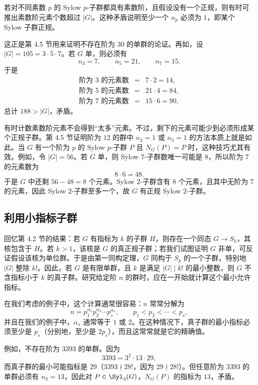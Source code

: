 若对不同素数 $p$ 的 Sylow $p$-子群都具有素数阶，且假设没有一个正规，则有时可推出素数阶元素个数超过 $|G|$。这种矛盾说明至少一个 $n_p$ 必须为 $1$，即某个 Sylow 子群正规。

这正是第 4.5 节用来证明不存在阶为 $30$ 的单群的论证。再如，设 $|G|=105=3\cdot5\cdot7$。若 $G$ 单，则必须有
\[
  n_3=7,
  \qquad n_5=21,
  \qquad n_7=15.
\]
于是
\[
\begin{array}{rcl}
\text{阶为 }3\text{ 的元素数} &=& 7\cdot2=14,\\
\text{阶为 }5\text{ 的元素数} &=& 21\cdot4=84,\\
\text{阶为 }7\text{ 的元素数} &=& 15\cdot6=90,
\end{array}
\]
总计 $188>|G|$，矛盾。

有时计数素数阶元素不会得到“太多”元素。不过，剩下的元素可能少到必须形成某个正规子群。第 4.5 节证明阶为 $12$ 的群中 $n_2=1$ 或 $n_3=1$ 的方法本质上就是如此。当 $G$ 有一个阶为 $p$ 的 Sylow $p$-子群 $P$ 且 $N_G(P)=P$ 时，这种技巧尤其有效。例如，令 $|G|=56$。若 $G$ 单，则 Sylow $7$-子群数唯一可能是 $8$，所以阶为 $7$ 的元素数为
\[
  8\cdot6=48.
\]
于是 $G$ 中还剩 $56-48=8$ 个元素。Sylow $2$-子群含有 $8$ 个元素，且其中无阶为 $7$ 的元素，因此 Sylow $2$-子群至多一个，故 $G$ 有正规 Sylow $2$-子群。

\subsection*{利用小指标子群}

回忆第 4.2 节的结果：若 $G$ 有指标为 $k$ 的子群 $H$，则存在一个同态 $G\to S_k$，其核包含于 $H$。若 $k>1$，该核是 $G$ 的真正规子群；若我们试图证明 $G$ 非单，可反证假设该核为单位群。于是由第一同构定理，$G$ 同构于 $S_k$ 的一个子群，特别地 $|G|$ 整除 $k!$。因此，若 $G$ 是有限单群，且 $k$ 是满足 $|G|\mid k!$ 的最小整数，则 $G$ 不含指标小于 $k$ 的真子群。研究给定阶 $n$ 的群时，应在一开始就计算这个最小允许指标。

在我们考虑的例子中，这个计算通常很容易：$n$ 常常分解为
\[
  n=p_1^{\alpha_1}p_2^{\alpha_2}\cdots p_s^{\alpha_s},
  \qquad p_1<p_2<\cdots<p_s,
\]
并且在我们的例子中，$\alpha_s$ 通常等于 $1$ 或 $2$。在这种情况下，真子群的最小指标必须至少是 $p_s$（分别地，至少是 $2p_s$），而且这常常就是它的精确值。

例如，不存在阶为 $3393$ 的单群。因为
\[
  3393=3^2\cdot 13\cdot29,
\]
而真子群的最小可能指标是 $29$（$3393\nmid 28!$，因为 $29\nmid 28!$）。但任意阶为 $3393$ 的单群必须有 $n_3=13$，因此对 $P\in\Syl_3(G)$，$N_G(P)$ 的指标为 $13$，矛盾。

